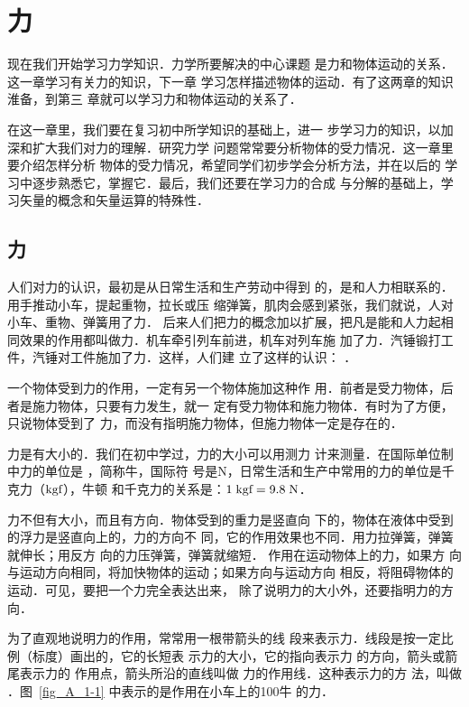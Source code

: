 \chapter{力}\label{chapter-force}

    现在我们开始学习力学知识．力学所要解决的中心课题
是力和物体运动的关系．这一章学习有关力的知识，下一章
学习怎样描述物体的运动．有了这两章的知识淮备，到第三
章就可以学习力和物体运动的关系了．

    在这一章里，我们要在复习初中所学知识的基础上，进一
步学习力的知识，以加深和扩大我们对力的理解．研究力学
问题常常要分析物体的受力情况．这一章里要介绍怎样分析
物体的受力情况，希望同学们初步学会分析方法，并在以后的
学习中逐步熟悉它，掌握它．最后，我们还要在学习力的合成
与分解的基础上，学习矢量的概念和矢量运算的特殊性．


\section{力} 
    人们对力的认识，最初是从日常生活和生产劳动中得到
的，是和人力相联系的．用手推动小车，提起重物，拉长或压
缩弹簧，肌肉会感到紧张，我们就说，人对小车、重物、弹簧用了力．
后来人们把力的概念加以扩展，把凡是能和人力起相
同效果的作用都叫做力．机车牵引列车前进，机车对列车施
加了力．汽锤锻打工件，汽锤对工件施加了力．这样，人们建
立了这样的认识： ．

一个物体受到力的作用，一定有另一个物体施加这种作
用．前者是受力物体，后者是施力物体，只要有力发生，就一
定有受力物体和施力物体．有时为了方便，只说物体受到了
力，而没有指明施力物体，但施力物体一定是存在的．

    力是有大小的．我们在初中学过，力的大小可以用测力
计来测量．在国际单位制中力的单位是 ，简称牛，国际符
号是N，日常生活和生产中常用的力的单位是千克力（$\text{kgf}$），牛顿
和千克力的关系是：$1 \;\text{kgf} =9.8 \;\text{N} $．

    力不但有大小，而且有方向．物体受到的重力是竖直向
下的，物体在液体中受到的浮力是竖直向上的，力的方向不
同，它的作用效果也不同．用力拉弹簧，弹簧就伸长；用反方
向的力压弹簧，弹簧就缩短．
作用在运动物体上的力，如果方
向与运动方向相同，将加快物体的运动；如果方向与运动方向
相反，将阻碍物体的运动．可见，要把一个力完全表达出来，
除了说明力的大小外，还要指明力的方向．

为了直观地说明力的作用，常常用一根带箭头的线
段来表示力．线段是按一定比
例（标度）画出的，它的长短表
示力的大小，它的指向表示力
的方向，箭头或箭尾表示力的
作用点，箭头所沿的直线叫做
力的作用线．这种表示力的方
法，叫做 ．图~\ref{fig_A_1-1} 中表示的是作用在小车上的100牛
的力．

